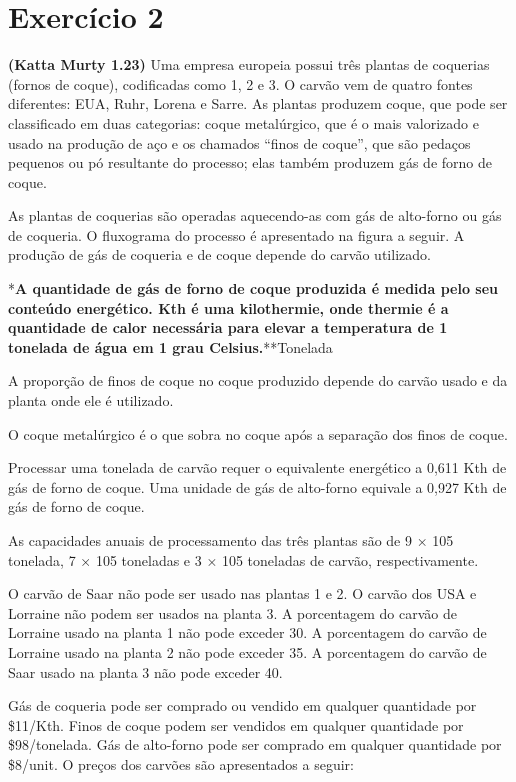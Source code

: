 \documentclass[
]{book}
\begin{document}
\section*{Exercício 2}\label{exercuxedcio-2}

\textbf{(Katta Murty 1.23)} Uma empresa europeia possui três plantas de coquerias (fornos de coque), codificadas como 1, 2 e 3. O carvão vem de quatro fontes diferentes: EUA, Ruhr, Lorena e Sarre. As plantas produzem coque, que pode ser classificado em duas categorias: coque metalúrgico, que é o mais valorizado e usado na produção de aço e os chamados ``finos de coque'', que são pedaços pequenos ou pó resultante do processo; elas também produzem gás de forno de coque.

As plantas de coquerias são operadas aquecendo-as com gás de alto-forno ou gás de coqueria. O fluxograma do processo é apresentado na figura a seguir. A produção de gás de coqueria e de coque depende do carvão utilizado.

*\textbf{A quantidade de gás de forno de coque produzida é medida pelo seu conteúdo energético. Kth é uma kilothermie, onde thermie é a quantidade de calor necessária para elevar a temperatura de 1 tonelada de água em 1 grau Celsius.}**Tonelada

A proporção de finos de coque no coque produzido depende do carvão usado e da planta onde ele é utilizado.

O coque metalúrgico é o que sobra no coque após a separação dos finos de coque.

Processar uma tonelada de carvão requer o equivalente energético a 0,611 Kth de gás de forno de coque. Uma unidade de gás de alto-forno equivale a 0,927 Kth de gás de forno de coque.

As capacidades anuais de processamento das três plantas são de 9 × 105 tonelada, 7 × 105 toneladas e 3 × 105 toneladas de carvão, respectivamente.

O carvão de Saar não pode ser usado nas plantas 1 e 2. O carvão dos USA e Lorraine não podem ser usados na planta 3. A porcentagem do carvão de Lorraine usado na planta 1 não pode exceder 30. A porcentagem do carvão de Lorraine usado na planta 2 não pode exceder 35. A porcentagem do carvão de Saar usado na planta 3 não pode exceder 40.

Gás de coqueria pode ser comprado ou vendido em qualquer quantidade por \$11/Kth. Finos de coque podem ser vendidos em qualquer quantidade por \$98/tonelada. Gás de alto-forno pode ser comprado em qualquer quantidade por \$8/unit. O preços dos carvões são apresentados a seguir:
\end{document}
